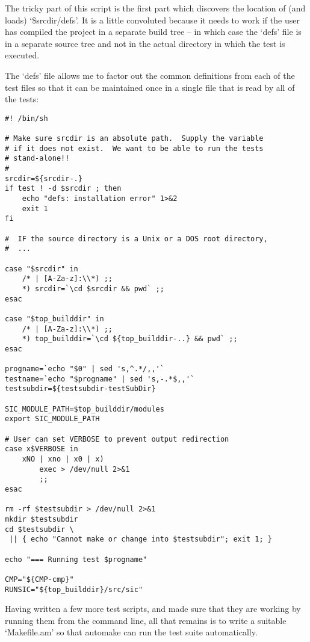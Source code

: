 The tricky part of this script is the first part which discovers the location 
of (and loads) `\$srcdir/defs'. It is a little convoluted because it needs to work if the user has compiled the project in a separate build tree -- in which case the `defs' file is in a separate source tree and not in the actual directory in which the test is executed.

The `defs' file allows me to factor out the common definitions from each of the test files so that it can be maintained once in a single file that is read by all of the tests: 

\begin{Verbatim}[frame=single]
#! /bin/sh

# Make sure srcdir is an absolute path.  Supply the variable
# if it does not exist.  We want to be able to run the tests
# stand-alone!!
#
srcdir=${srcdir-.}
if test ! -d $srcdir ; then
    echo "defs: installation error" 1>&2
    exit 1
fi

#  IF the source directory is a Unix or a DOS root directory,
#  ...

case "$srcdir" in
    /* | [A-Za-z]:\\*) ;;
    *) srcdir=`\cd $srcdir && pwd` ;;
esac

case "$top_builddir" in
    /* | [A-Za-z]:\\*) ;;
    *) top_builddir=`\cd ${top_builddir-..} && pwd` ;;
esac

progname=`echo "$0" | sed 's,^.*/,,'`
testname=`echo "$progname" | sed 's,-.*$,,'`
testsubdir=${testsubdir-testSubDir}

SIC_MODULE_PATH=$top_builddir/modules
export SIC_MODULE_PATH

# User can set VERBOSE to prevent output redirection
case x$VERBOSE in
    xNO | xno | x0 | x)
        exec > /dev/null 2>&1
        ;;
esac

rm -rf $testsubdir > /dev/null 2>&1
mkdir $testsubdir
cd $testsubdir \
 || { echo "Cannot make or change into $testsubdir"; exit 1; }

echo "=== Running test $progname"

CMP="${CMP-cmp}"
RUNSIC="${top_builddir}/src/sic"
\end{Verbatim}

Having written a few more test scripts, and made sure that they are working by running them from the command line, all that remains is to write a suitable `Makefile.am' so that automake can run the test suite automatically.

